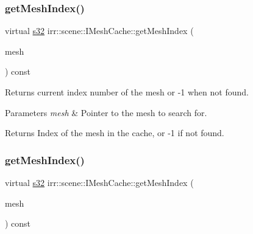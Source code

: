 \subsubsection{\texorpdfstring{get\+Mesh\+Index()}{getMeshIndex()}\hspace{0.1cm}{\footnotesize\ttfamily [1/2]}}
{\footnotesize\ttfamily virtual \hyperlink{namespaceirr_ac66849b7a6ed16e30ebede579f9b47c6}{s32} irr\+::scene\+::\+I\+Mesh\+Cache\+::get\+Mesh\+Index (\begin{DoxyParamCaption}\item[{const \hyperlink{classirr_1_1scene_1_1IMesh}{I\+Mesh} $\ast$const}]{mesh }\end{DoxyParamCaption}) const\hspace{0.3cm}{\ttfamily [pure virtual]}}



Returns current index number of the mesh or -\/1 when not found. 


\begin{DoxyParams}{Parameters}
{\em mesh} & Pointer to the mesh to search for. \\
\hline
\end{DoxyParams}
\begin{DoxyReturn}{Returns}
Index of the mesh in the cache, or -\/1 if not found. 
\end{DoxyReturn}
\mbox{\label{classirr_1_1scene_1_1IMeshCache_a2b3512bd3ff11d0b290fa5d2d580eb54}} 
\subsubsection{\texorpdfstring{get\+Mesh\+Index()}{getMeshIndex()}\hspace{0.1cm}{\footnotesize\ttfamily [2/2]}}
{\footnotesize\ttfamily virtual \hyperlink{namespaceirr_ac66849b7a6ed16e30ebede579f9b47c6}{s32} irr\+::scene\+::\+I\+Mesh\+Cache\+::get\+Mesh\+Index (\begin{DoxyParamCaption}\item[{const \hyperlink{classirr_1_1scene_1_1IMesh}{I\+Mesh} $\ast$const}]{mesh }\end{DoxyParamCaption}) const\hspace{0.3cm}{\ttfamily [pure virtual]}}



